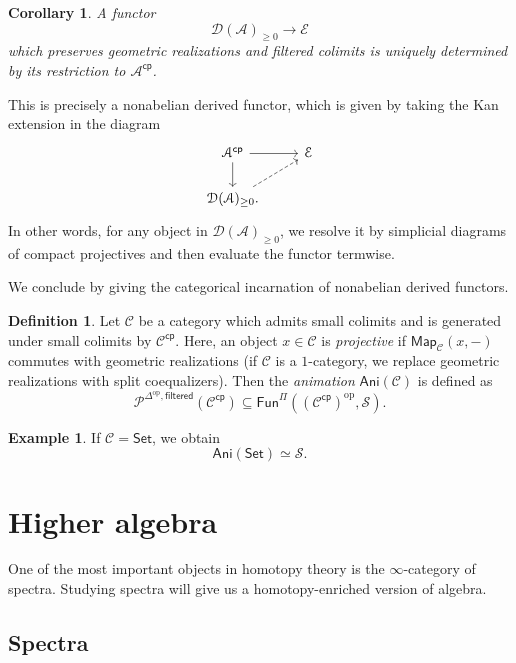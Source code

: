 \documentclass[10pt]{amsart}
\newtheorem{cor}[thm]{Corollary}
\theoremstyle{definition}
\newtheorem{defn}[thm]{Definition}
\newtheorem{exm}[thm]{Example}
\theoremstyle{remark}
\theoremstyle{plain}
\theoremstyle{definition}
\theoremstyle{remark}
\newcommand{\mc}[1]{\mathcal{#1}}
\newcommand{\ms}[1]{\mathsf{#1}}
\newcommand{\1}{\mathbf{1}}
\newcommand{\2}{\mathbf{2}}
\newcommand{\3}{\mathbf{3}}
\DeclareMathOperator{\op}{op}
\begin{document}
\begin{cor}
    A functor
    \[ \mc{D}(\mc{A})_{\geq 0} \to \mc{E} \]
    which preserves geometric realizations and filtered colimits is uniquely determined by its restriction to $\mc{A}^{\ms{cp}}$.
\end{cor}

This is precisely a nonabelian derived functor, which is given by taking the Kan extension in the diagram
\begin{equation*}
\begin{tikzcd}
    \mc{A}^{\ms{cp}} \ar{r} \ar{d} & \mc{E} \\
    \mc{D}(\mc{A})_{\geq 0} \ar[dashrightarrow]{ur}.
\end{tikzcd}
\end{equation*}
In other words, for any object in $\mc{D}(\mc{A})_{\geq 0}$, we resolve it by simplicial diagrams of compact projectives and then evaluate the functor termwise.

We conclude by giving the categorical incarnation of nonabelian derived functors.
\begin{defn}
    Let $\mc{C}$ be a category which admits small colimits and is generated under small colimits by $\mc{C}^{\ms{cp}}$. Here, an object $x \in \mc{C}$ is \textit{projective} if $\ms{Map}_{\mc{C}}(x,-)$ commutes with geometric realizations (if $\mc{C}$ is a $1$-category, we replace geometric realizations with split coequalizers). Then the \textit{animation} $\ms{Ani}(\mc{C})$ is defined as
    \[ \mc{P}^{\Delta^{\op}, \ms{filtered}}(\mc{C}^{\ms{cp}}) \subseteq \ms{Fun}^{\Pi} ((\mc{C}^{\ms{cp}})^{\op}, \mc{S}). \]
\end{defn}

\begin{exm}
    If $\mc{C} = \ms{Set}$, we obtain
    \[ \ms{Ani}(\ms{Set}) \simeq \mc{S}. \]
\end{exm}




\section{Higher algebra}%
\label{sec:Higher algebra}

One of the most important objects in homotopy theory is the $\infty$-category of spectra. Studying spectra will give us a homotopy-enriched version of algebra.

\subsection{Spectra}%
\label{sub:Spectra}
\end{document}
